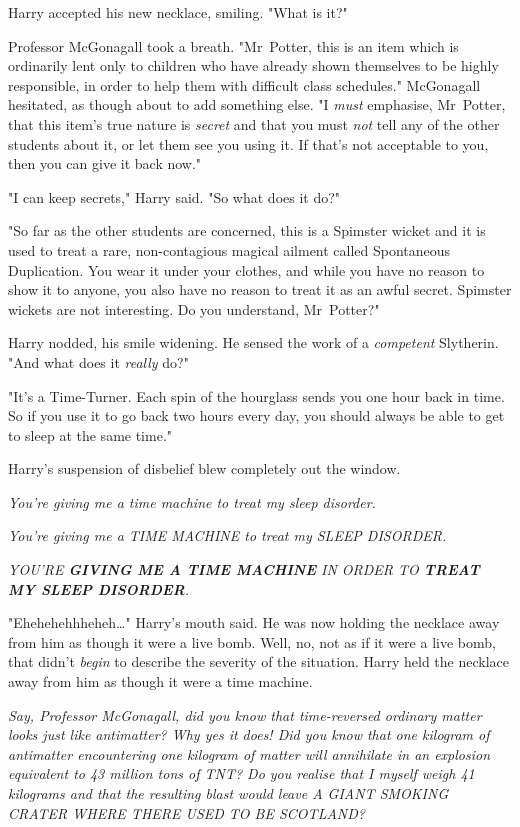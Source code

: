 Harry accepted his new necklace, smiling. "What is it?"

Professor McGonagall took a breath. "Mr~Potter, this is an item which is
ordinarily lent only to children who have already shown themselves to be highly
responsible, in order to help them with difficult class schedules." McGonagall
hesitated, as though about to add something else. "I \emph{must} emphasise,
Mr~Potter, that this item's true nature is \emph{secret} and that you
must \emph{not} tell any of the other students about it, or let them see you
using it. If that's not acceptable to you, then you can give it back now."

"I can keep secrets," Harry said. "So what does it do?"

"So far as the other students are concerned, this is a Spimster wicket and it
is used to treat a rare, non-contagious magical ailment called Spontaneous
Duplication. You wear it under your clothes, and while you have no reason to
show it to anyone, you also have no reason to treat it as an awful secret.
Spimster wickets are not interesting. Do you understand, Mr~Potter?"

Harry nodded, his smile widening. He sensed the work of a \emph{competent}
Slytherin. "And what does it \emph{really} do?"

"It's a Time-Turner. Each spin of the hourglass sends you one hour back in
time. So if you use it to go back two hours every day, you should always be
able to get to sleep at the same time."

Harry's suspension of disbelief blew completely out the window.

\emph{You're giving me a time machine to treat my sleep disorder.}

\emph{You're giving me a TIME MACHINE to treat my SLEEP DISORDER.}

\emph{YOU'RE \textbf{GIVING ME A TIME MACHINE} IN ORDER TO
\textbf{TREAT MY SLEEP DISORDER}.}

"Ehehehehhheheh…" Harry's mouth said. He was now holding the necklace
away from him as though it were a live bomb. Well, no, not as if it were a live
bomb, that didn't \emph{begin} to describe the severity of the situation. Harry
held the necklace away from him as though it were a time machine.

\emph{Say, Professor McGonagall, did you know that time-reversed ordinary
matter looks just like antimatter? Why yes it does! Did you know that one
kilogram of antimatter encountering one kilogram of matter will annihilate in
an explosion equivalent to 43 million tons of TNT? Do you realise that I myself
weigh 41 kilograms and that the resulting blast would leave A GIANT SMOKING
CRATER WHERE THERE USED TO BE SCOTLAND?}

